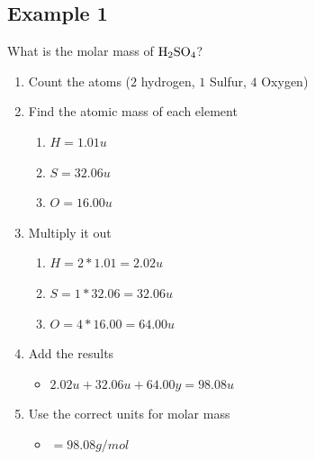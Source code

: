 \documentclass{scrartcl}
\begin{document}
\subsection{Example 1}
\label{sec:org017097c}
What is the molar mass of \(\ce{H2SO4}\)?
\begin{enumerate}
\item Count the atoms (\(2\) hydrogen, \(1\) Sulfur, \(4\) Oxygen)
\item Find the atomic mass of each element 
\begin{enumerate}
\item \(H = 1.01u\)
\item \(S = 32.06u\)
\item \(O = 16.00u\)
\end{enumerate}
\item Multiply it out 
\begin{enumerate}
\item \(H = 2*1.01 = 2.02u\)
\item \(S = 1*32.06 = 32.06u\)
\item \(O = 4*16.00 = 64.00u\)
\end{enumerate}
\item Add the results 
\begin{itemize}
\item \(2.02u + 32.06u + 64.00y = 98.08u\)
\end{itemize}
\item Use the correct units for molar mass 
\begin{itemize}
\item \(= 98.08 g/mol\)
\end{itemize}
\end{enumerate}
\end{document}

